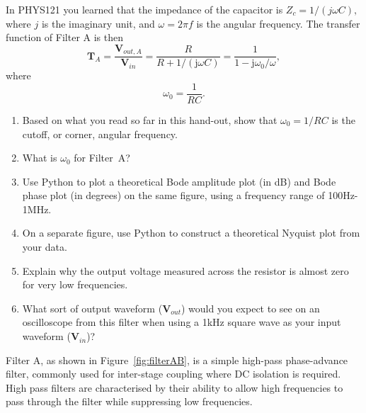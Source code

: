 \documentclass{article}
\begin{document}
In PHYS121 you learned that the impedance of the capacitor is
$Z_c= 1/(j\omega C),$ where $j$ is the imaginary unit, and
$\omega = 2\pi f$ is the angular frequency. The transfer function of
Filter A is then
\begin{equation}
  \mathbf{T}_A=\frac{\mathbf{V}_{out, A}}{\mathbf{V}_{in}}=
  \frac{R}{R+1/(\mathrm{j}\omega C)}=\frac{1}{1-\mathrm{j}\omega_0/\omega},
\end{equation}
where
\begin{equation}
  \omega_0=\frac{1}{RC}.
\end{equation}
\begin{enumerate}
\item Based on what you read so far in this hand-out, show that
  $\omega_0 = 1/RC$ is the cutoff, or corner, angular
  frequency. %
\item What is $\omega_0$ for Filter~A?
\item Use Python to plot a theoretical Bode amplitude plot (in
  dB) and Bode phase plot (in degrees) on the same figure, using a
  frequency range of 100Hz-1MHz.
\item On a separate figure, use Python to
  construct a theoretical Nyquist plot from your data.
\item Explain why the output voltage measured
  across the resistor is almost zero for very low
  frequencies. %
\item What sort of output waveform ($\mathbf{V}_{out}$) would you
  expect to see on an oscilloscope from this filter when using a 1kHz
  square wave as your input waveform
  ($\mathbf{V}_{in}$)? %
\end{enumerate}

Filter A, as shown in Figure~\ref{fig:filterAB}, is a simple high-pass
phase-advance filter, commonly used for inter-stage coupling where DC
isolation is required.  High pass filters are characterised by their
ability to allow high frequencies to pass through the filter while
suppressing low frequencies.
\end{document}
